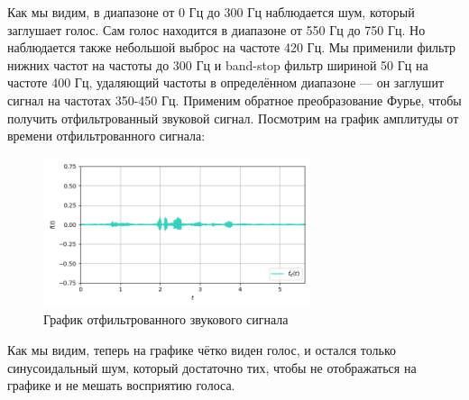 \documentclass[a4paper]{article}
\begin{document}
Как мы видим, в диапазоне от 0 Гц до 300 Гц наблюдается шум, который заглушает голос. Сам голос находится в диапазоне от 550 Гц до 750 Гц. Но наблюдается также небольшой выброс на частоте 420 Гц. Мы применили фильтр нижних частот на частоты до 300 Гц и band-stop фильтр шириной 50 Гц на частоте 400 Гц, удаляющий частоты в определённом диапазоне --- он заглушит сигнал на частотах 350-450 Гц.\newpage
Применим обратное преобразование Фурье, чтобы получить отфильтрованный звуковой сигнал. Посмотрим на график амплитуды от времени отфильтрованного сигнала:
\begin{figure}[H]
    \centering \includegraphics[width=0.7\textwidth]{sources/audio/MUHA_denoised.png}
    \caption{График отфильтрованного звукового сигнала}
\end{figure}
Как мы видим, теперь на графике чётко виден голос, и остался только синусоидальный шум, который достаточно тих, чтобы не отображаться на графике и не мешать восприятию голоса.
\end{document}
